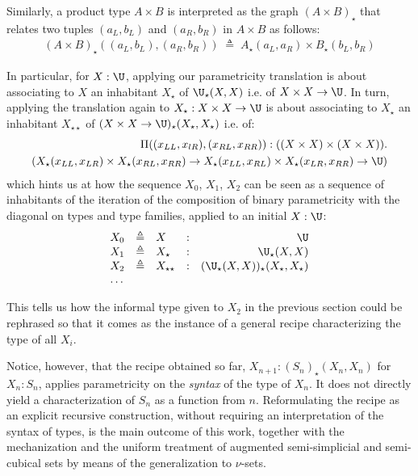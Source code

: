 \documentclass{msc}
\newcommand{\defeq}{\ensuremath{\triangleq}}
\newcommand{\kstar}{{\star}}
\begin{document}
Similarly, a product type $A \times B$ is interpreted as the graph $(A \times B)_\kstar$ that relates two tuples $(a_L,b_L)$ and $(a_R,b_R)$ in $A \times B$ as follows:
\begin{align*}
  (A \times B)_\kstar((a_L,b_L),(a_R,b_R)) \; \defeq \; A_\kstar(a_L,a_R) \times B_\kstar(b_L,b_R)
\end{align*}

In particular, for $X: \U$, applying our parametricity translation is about associating to $X$ an inhabitant $X_\kstar$ of ${\U}_\kstar(X,X)$ i.e. of $X \times X \rightarrow \U$. In turn, applying the translation again to $X_\kstar: X \times X \rightarrow \U$ is about associating to $X_\kstar$ an inhabitant $X_{\kstar\kstar}$ of $(X \times X \rightarrow \U)_\kstar(X_\kstar,X_\kstar)$ i.e. of:
\begin{align*}
  \Pi ((x_{LL},x_{lR}),(x_{RL},x_{RR})): ((X \times X) \times (X \times X)). \\
  (X_\kstar(x_{LL},x_{LR}) \times X_\kstar(x_{RL},x_{RR})
  \rightarrow X_\kstar(x_{LL}, x_{RL}) \times X_\kstar(x_{LR},x_{RR})  \rightarrow \U)
\end{align*}
which hints us at how the sequence $X_0$, $X_1$, $X_2$ can be seen as a sequence of inhabitants of the iteration of the composition of binary parametricity with the diagonal on types and type families, applied to an initial $X: \U$:
\begin{equation*}
  \begin{array}{llllr}
    X_0 & \defeq & X                & : & \U                                             \\
    X_1 & \defeq & X_\kstar         & : & {\U}_\kstar(X,X)                               \\
    X_2 & \defeq & X_{\kstar\kstar} & : & ({\U}_\kstar(X,X))_{\kstar}(X_\kstar,X_\kstar) \\
    \ldots
  \end{array}
\end{equation*}

This tells us how the informal type given to $X_2$ in the previous section could be rephrased so that it comes as the instance of a general recipe characterizing the type of all $X_i$.

Notice, however, that the recipe obtained so far, $X_{n + 1}: ({S_n})_\kstar(X_n,X_n)$ for $X_n: S_n$, applies parametricity on the \emph{syntax} of the type of $X_n$. It does not directly yield a characterization of $S_n$ as a function from $n$. Reformulating the recipe as an explicit recursive construction, without requiring an interpretation of the syntax of types, is the main outcome of this work, together with the mechanization and the uniform treatment of augmented semi-simplicial and semi-cubical sets by means of the generalization to $\nu$-sets.
\end{document}
